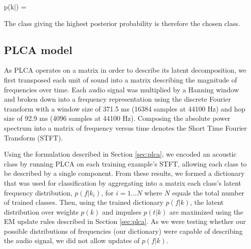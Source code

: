 \documentclass[a4paper,10pt,final]{ThesisStyle}
\begin{document}
\begin{equationb}
p(k|) =   
\end{equationb}

The class giving the highest posterior probability is therefore the chosen class.

\subsection{PLCA model}

As PLCA operates on a matrix in order to describe its latent decomposition, we first transposed each unit of sound into a matrix describing the magnitude of frequencies over time.  Each audio signal was multiplied by a Hanning window and broken down into a frequency representation using the discrete Fourier transform with a window size of 371.5 ms (16384 samples at 44100 Hz) and hop size of 92.9 ms (4096 samples at 44100 Hz).  Composing the absolute power spectrum into a matrix of frequency versus time denotes the Short Time Fourier Transform (STFT).

Using the formulation described in Section \ref{sec:plca}, we encoded an acoustic class by running PLCA on each training example's STFT, allowing each class to be described by a single component.  From these results, we formed a dictionary that was used for classification by aggregating into a matrix each class's latent frequency distribution, $p(f|k_i)$, for $i = {1...N}$ where $N$ equals the total number of trained classes.  Then, using the trained dictionary $p(f|k)$, the latent distribution over weights $p(k)$ and impulses $p(t|k)$ are maximized using the EM update rules described in Section \ref{sec:plca}.  As we were testing whether our possible distributions of frequencies (our dictionary) were capable of describing the audio signal, we did not allow updates of $p(f|k)$.

\end{document}
